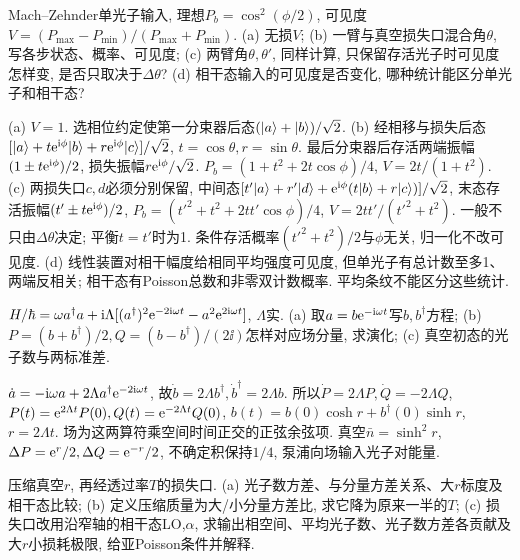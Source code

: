 \begin{exercise}Mach--Zehnder单光子输入, 理想$P_b=\cos^2(\phi/2)$, 可见度$V=(P_{\max}-P_{\min})/(P_{\max}+P_{\min})$. (a) 无损$V$; (b) 一臂与真空损失口混合角$\theta$, 写各步状态、概率、可见度; (c) 两臂角$\theta,\theta'$, 同样计算, 只保留存活光子时可见度怎样变, 是否只取决于$\Delta\theta$? (d) 相干态输入的可见度是否变化, 哪种统计能区分单光子和相干态?\end{exercise}
\begin{solution}(a) $V=1$. 选相位约定使第一分束器后态$(\lvert a\rangle+\lvert b\rangle)/\sqrt2$. (b) 经相移与损失后态$[\lvert a\rangle+t\mathrm e^{\mathrm i\phi}\lvert b\rangle+r\mathrm e^{\mathrm i\phi}\lvert c\rangle]/\sqrt2$, $t=\cos\theta,r=\sin\theta$. 最后分束器后存活两端振幅$(1\pm t\mathrm e^{\mathrm i\phi})/2$, 损失振幅$r\mathrm e^{\mathrm i\phi}/\sqrt2$. $P_b=(1+t^2+2t\cos\phi)/4$, $V=2t/(1+t^2)$. (c) 两损失口$c,d$必须分别保留, 中间态$[t'\lvert a\rangle+r'\lvert d\rangle+\mathrm e^{\mathrm i\phi}(t\lvert b\rangle+r\lvert c\rangle)]/\sqrt2$, 末态存活振幅$(t'\pm t\mathrm e^{\mathrm i\phi})/2$, $P_b=(t'^2+t^2+2tt'\cos\phi)/4$, $V=2tt'/(t'^2+t^2)$. 一般不只由$\Delta\theta$决定; 平衡$t=t'$时为1. 条件存活概率$(t'^2+t^2)/2$与$\phi$无关, 归一化不改可见度. (d) 线性装置对相干幅度给相同平均强度可见度, 但单光子有总计数至多1、两端反相关; 相干态有Poisson总数和非零双计数概率. 平均条纹不能区分这些统计.
\end{solution}
\begin{exercise}$H/\hbar=\omega a^\dagger a+\mathrm i\Lambda[(a^\dagger)^2\mathrm e^{-2\mathrm i\omega t}-a^2\mathrm e^{2\mathrm i\omega t}]$, $\Lambda$实. (a) 取$a=b\mathrm e^{-\mathrm i\omega t}$写$b,b^\dagger$方程; (b) $P=(b+b^\dagger)/2,Q=(b-b^\dagger)/(2\ii)$怎样对应场分量, 求演化; (c) 真空初态的光子数与两标准差.\end{exercise}
\begin{solution}$\dot a=-\mathrm i\omega a+2\Lambda a^\dagger\mathrm e^{-2\mathrm i\omega t}$, 故$\dot b=2\Lambda b^\dagger,\dot b^\dagger=2\Lambda b$. 所以$\dot P=2\Lambda P,\dot Q=-2\Lambda Q$, $P(t)=\mathrm e^{2\Lambda t}P(0),Q(t)=\mathrm e^{-2\Lambda t}Q(0)$, $b(t)=b(0)\cosh r+b^\dagger(0)\sinh r$, $r=2\Lambda t$. 场为这两算符乘空间时间正交的正弦余弦项. 真空$\bar n=\sinh^2r$, $\Delta P=\mathrm e^r/2,\Delta Q=\mathrm e^{-r}/2$, 不确定积保持$1/4$, 泵浦向场输入光子对能量.
\end{solution}
\begin{exercise}压缩真空$r$, 再经透过率$T$的损失口. (a) 光子数方差、与分量方差关系、大$r$标度及相干态比较; (b) 定义压缩质量为大/小分量方差比, 求它降为原来一半的$T$; (c) 损失口改用沿窄轴的相干态LO,$\alpha$, 求输出相空间、平均光子数、光子数方差各贡献及大$r$小损耗极限, 给亚Poisson条件并解释.\end{exercise}
